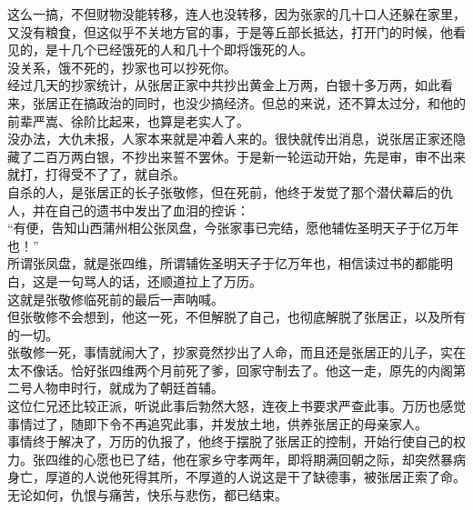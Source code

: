 \begin{multicols}{\theparacolNo}
这么一搞，不但财物没能转移，连人也没转移，因为张家的几十口人还躲在家里，又没有粮食，但这似乎不关地方官的事，于是等丘部长抵达，打开门的时候，他看见的，是十几个已经饿死的人和几十个即将饿死的人。\\

没关系，饿不死的，抄家也可以抄死你。\\

经过几天的抄家统计，从张居正家中共抄出黄金上万两，白银十多万两，如此看来，张居正在搞政治的同时，也没少搞经济。但总的来说，还不算太过分，和他的前辈严嵩、徐阶比起来，也算是老实人了。\\

没办法，大仇未报，人家本来就是冲着人来的。很快就传出消息，说张居正家还隐藏了二百万两白银，不抄出来誓不罢休。于是新一轮运动开始，先是审，审不出来就打，打得受不了了，就自杀。\\

自杀的人，是张居正的长子张敬修，但在死前，他终于发觉了那个潜伏幕后的仇人，并在自己的遗书中发出了血泪的控诉：\\

“有便，告知山西蒲州相公张凤盘，今张家事已完结，愿他辅佐圣明天子于亿万年也！”\\

所谓张凤盘，就是张四维，所谓辅佐圣明天子于亿万年也，相信读过书的都能明白，这是一句骂人的话，还顺道拉上了万历。\\

这就是张敬修临死前的最后一声呐喊。\\

但张敬修不会想到，他这一死，不但解脱了自己，也彻底解脱了张居正，以及所有的一切。\\

张敬修一死，事情就闹大了，抄家竟然抄出了人命，而且还是张居正的儿子，实在太不像话。恰好张四维两个月前死了爹，回家守制去了。他这一走，原先的内阁第二号人物申时行，就成为了朝廷首辅。\\

这位仁兄还比较正派，听说此事后勃然大怒，连夜上书要求严查此事。万历也感觉事情过了，随即下令不再追究此事，并发放土地，供养张居正的母亲家人。\\

事情终于解决了，万历的仇报了，他终于摆脱了张居正的控制，开始行使自己的权力。张四维的心愿也已了结，他在家乡守孝两年，即将期满回朝之际，却突然暴病身亡，厚道的人说他死得其所，不厚道的人说这是干了缺德事，被张居正索了命。\\

无论如何，仇恨与痛苦，快乐与悲伤，都已结束。\\


\end{multicols}
